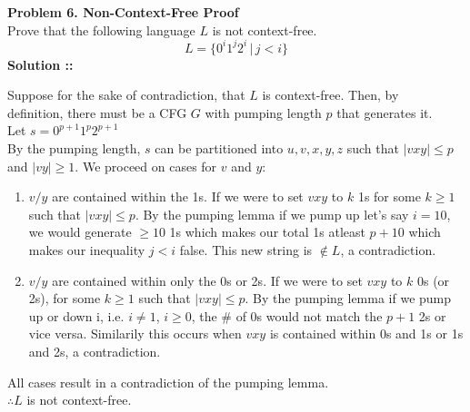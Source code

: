\documentclass[11pt]{article}
\begin{document}

\textbf{Problem 6. Non-Context-Free Proof} \\
Prove that the following language $L$ is not context-free.
$$L=\{0^i1^j2^i\,|\,j<i\}$$
\vspace{5px}\textbf{Solution ::}

Suppose for the sake of contradiction, that $L$ is context-free. Then, by \\definition,
there must be a CFG $G$ with pumping length $p$ that generates it. \\
Let $s = 0^{p+1}1^p2^{p+1}$ \\
By the pumping length, $s$ can be partitioned into $u,v,x,y,z$ such that
$|vxy|\le p$ and $|vy| \ge 1$. We proceed on cases for $v$ and $y$:
\begin{enumerate}[\hspace{5px}-]
\item 
$v/y$ are contained within the 1s. If we were to set $vxy$ to $k$ 1s for some
$k \ge 1$ such that $|vxy|\le p$. By the pumping lemma if we pump up let's
say $i=10$, we would generate $\ge 10$ 1s which makes our total 1s atleast
$p+10$ which makes our inequality $j<i$ false. This new string is $\notin L$,
a contradiction.

\item
$v/y$ are contained within only the 0s or 2s. If we were to set $vxy$ to $k$ 0s
(or 2s), for some $k\ge 1$ such that $|vxy|\le p$. By the pumping lemma if we
pump up or down i, i.e. $i\neq 1$, $i\ge 0$, the \# of 0s would not match
the $p+1$ 2s or vice versa. Similarily this occurs when $vxy$ is contained
within 0s and 1s or 1s and 2s, a contradiction.
\end{enumerate}
All cases result in a contradiction of the pumping lemma. \\
$\therefore L$ is not context-free.
\end{document}
